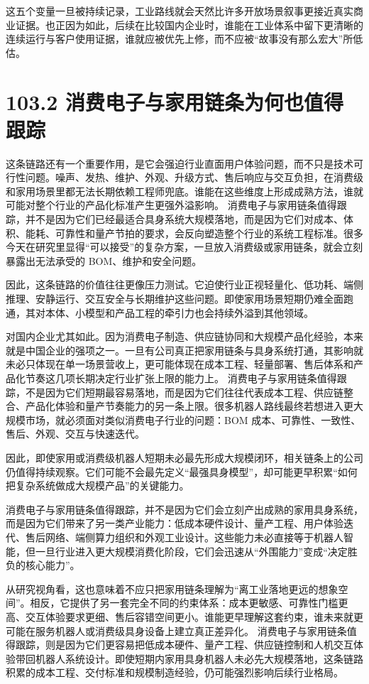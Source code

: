 这五个变量一旦被持续记录，工业路线就会天然比许多开放场景叙事更接近真实商业证据。也正因为如此，后续在比较国内企业时，谁能在工业体系中留下更清晰的连续运行与客户使用证据，谁就应被优先上修，而不应被“故事没有那么宏大”所低估。

\section*{103.2 消费电子与家用链条为何也值得跟踪}


这条链路还有一个重要作用，是它会强迫行业直面用户体验问题，而不只是技术可行性问题。噪声、发热、维护、外观、升级方式、售后响应与交互负担，在消费级和家用场景里都无法长期依赖工程师兜底。谁能在这些维度上形成成熟方法，谁就可能对整个行业的产品化标准产生更强外溢影响。 消费电子与家用链条值得跟踪，并不是因为它们已经最适合具身系统大规模落地，而是因为它们对成本、体积、能耗、可靠性和量产节拍的要求，会反向塑造整个行业的系统工程标准。很多今天在研究里显得“可以接受”的复杂方案，一旦放入消费级或家用链条，就会立刻暴露出无法承受的 BOM、维护和安全问题。

因此，这条链路的价值往往更像压力测试。它迫使行业正视轻量化、低功耗、端侧推理、安静运行、交互安全与长期维护这些问题。即使家用场景短期仍难全面跑通，其对本体、小模型和产品工程的牵引力也会持续外溢到其他领域。

对国内企业尤其如此。因为消费电子制造、供应链协同和大规模产品化经验，本来就是中国企业的强项之一。一旦有公司真正把家用链条与具身系统打通，其影响就未必只体现在单一场景营收上，更可能体现在成本工程、轻量部署、售后体系和产品化节奏这几项长期决定行业扩张上限的能力上。 消费电子与家用链条值得跟踪，不是因为它们短期最容易落地，而是因为它们往往代表成本工程、供应链整合、产品化体验和量产节奏能力的另一条上限。很多机器人路线最终若想进入更大规模市场，就必须面对类似消费电子行业的问题：BOM 成本、可靠性、一致性、售后、外观、交互与快速迭代。

因此，即使家用或消费级机器人短期未必最先形成大规模闭环，相关链条上的公司仍值得持续观察。它们可能不会最先定义“最强具身模型”，却可能更早积累“如何把复杂系统做成大规模产品”的关键能力。

消费电子与家用链条值得跟踪，并不是因为它们会立刻产出成熟的家用具身系统，而是因为它们带来了另一类产业能力：低成本硬件设计、量产工程、用户体验迭代、售后网络、端侧算力组织和外观工业设计。这些能力未必直接等于机器人智能，但一旦行业进入更大规模消费化阶段，它们会迅速从“外围能力”变成“决定胜负的核心能力”。

从研究视角看，这也意味着不应只把家用链条理解为“离工业落地更远的想象空间”。相反，它提供了另一套完全不同的约束体系：成本更敏感、可靠性门槛更高、交互体验要求更细、售后容错空间更小。谁能更早理解这套约束，谁未来就更可能在服务机器人或消费级具身设备上建立真正差异化。 消费电子与家用链条值得跟踪，则是因为它们更容易把低成本硬件、量产工程、供应链控制和人机交互体验带回机器人系统设计。即使短期内家用具身机器人未必先大规模落地，这条链路积累的成本工程、交付标准和规模制造经验，仍可能强烈影响后续行业格局。

